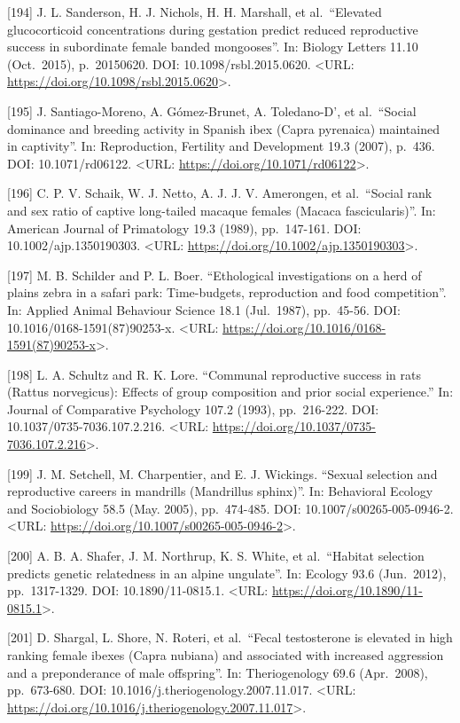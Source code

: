 \documentclass[
]{article}
\begin{document}
{[}194{]} J. L. Sanderson, H. J. Nichols, H. H. Marshall, et
al.~``Elevated glucocorticoid concentrations during gestation predict
reduced reproductive success in subordinate female banded mongooses''.
In: Biology Letters 11.10 (Oct.~2015), p.~20150620. DOI:
10.1098/rsbl.2015.0620. \textless URL:
\url{https://doi.org/10.1098/rsbl.2015.0620}\textgreater.

{[}195{]} J. Santiago-Moreno, A. Gómez-Brunet, A. Toledano-D', et
al.~``Social dominance and breeding activity in Spanish ibex (Capra
pyrenaica) maintained in captivity''. In: Reproduction, Fertility and
Development 19.3 (2007), p.~436. DOI: 10.1071/rd06122. \textless URL:
\url{https://doi.org/10.1071/rd06122}\textgreater.

{[}196{]} C. P. V. Schaik, W. J. Netto, A. J. J. V. Amerongen, et
al.~``Social rank and sex ratio of captive long-tailed macaque females
(Macaca fascicularis)''. In: American Journal of Primatology 19.3
(1989), pp.~147-161. DOI: 10.1002/ajp.1350190303. \textless URL:
\url{https://doi.org/10.1002/ajp.1350190303}\textgreater.

{[}197{]} M. B. Schilder and P. L. Boer. ``Ethological investigations on
a herd of plains zebra in a safari park: Time-budgets, reproduction and
food competition''. In: Applied Animal Behaviour Science 18.1
(Jul.~1987), pp.~45-56. DOI: 10.1016/0168-1591(87)90253-x.
\textless URL:
\url{https://doi.org/10.1016/0168-1591(87)90253-x}\textgreater.

{[}198{]} L. A. Schultz and R. K. Lore. ``Communal reproductive success
in rats (Rattus norvegicus): Effects of group composition and prior
social experience.'' In: Journal of Comparative Psychology 107.2 (1993),
pp.~216-222. DOI: 10.1037/0735-7036.107.2.216. \textless URL:
\url{https://doi.org/10.1037/0735-7036.107.2.216}\textgreater.

{[}199{]} J. M. Setchell, M. Charpentier, and E. J. Wickings. ``Sexual
selection and reproductive careers in mandrills (Mandrillus sphinx)''.
In: Behavioral Ecology and Sociobiology 58.5 (May. 2005), pp.~474-485.
DOI: 10.1007/s00265-005-0946-2. \textless URL:
\url{https://doi.org/10.1007/s00265-005-0946-2}\textgreater.

{[}200{]} A. B. A. Shafer, J. M. Northrup, K. S. White, et al.~``Habitat
selection predicts genetic relatedness in an alpine ungulate''. In:
Ecology 93.6 (Jun.~2012), pp.~1317-1329. DOI: 10.1890/11-0815.1.
\textless URL: \url{https://doi.org/10.1890/11-0815.1}\textgreater.

{[}201{]} D. Shargal, L. Shore, N. Roteri, et al.~``Fecal testosterone
is elevated in high ranking female ibexes (Capra nubiana) and associated
with increased aggression and a preponderance of male offspring''. In:
Theriogenology 69.6 (Apr.~2008), pp.~673-680. DOI:
10.1016/j.theriogenology.2007.11.017. \textless URL:
\url{https://doi.org/10.1016/j.theriogenology.2007.11.017}\textgreater.
\end{document}
